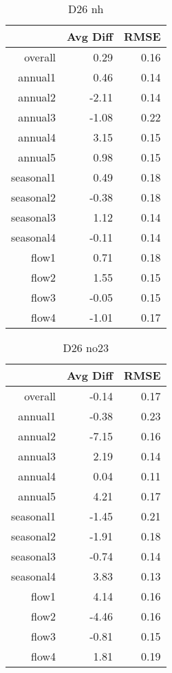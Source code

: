 \begin{table}[H]
\centering
\begin{tabular}{rrr}
  \hline
 & Avg Diff & RMSE \\ 
  \hline
overall & 0.29 & 0.16 \\ 
  annual1 & 0.46 & 0.14 \\ 
  annual2 & -2.11 & 0.14 \\ 
  annual3 & -1.08 & 0.22 \\ 
  annual4 & 3.15 & 0.15 \\ 
  annual5 & 0.98 & 0.15 \\ 
  seasonal1 & 0.49 & 0.18 \\ 
  seasonal2 & -0.38 & 0.18 \\ 
  seasonal3 & 1.12 & 0.14 \\ 
  seasonal4 & -0.11 & 0.14 \\ 
  flow1 & 0.71 & 0.18 \\ 
  flow2 & 1.55 & 0.15 \\ 
  flow3 & -0.05 & 0.15 \\ 
  flow4 & -1.01 & 0.17 \\ 
   \hline
\end{tabular}
\caption{D26 nh} 
\end{table}
\begin{table}[H]
\centering
\begin{tabular}{rrr}
  \hline
 & Avg Diff & RMSE \\ 
  \hline
overall & -0.14 & 0.17 \\ 
  annual1 & -0.38 & 0.23 \\ 
  annual2 & -7.15 & 0.16 \\ 
  annual3 & 2.19 & 0.14 \\ 
  annual4 & 0.04 & 0.11 \\ 
  annual5 & 4.21 & 0.17 \\ 
  seasonal1 & -1.45 & 0.21 \\ 
  seasonal2 & -1.91 & 0.18 \\ 
  seasonal3 & -0.74 & 0.14 \\ 
  seasonal4 & 3.83 & 0.13 \\ 
  flow1 & 4.14 & 0.16 \\ 
  flow2 & -4.46 & 0.16 \\ 
  flow3 & -0.81 & 0.15 \\ 
  flow4 & 1.81 & 0.19 \\ 
   \hline
\end{tabular}
\caption{D26 no23} 
\end{table}
